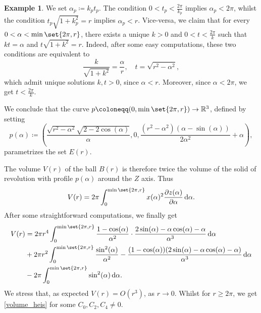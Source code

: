 \documentclass[a4paper,11pt,reqno]{amsart}
\theoremstyle{plain}
\theoremstyle{definition}
\newtheorem{example}[theorem]{Example}
\newcommand{\R}{\mathbb R}
\newcommand{\de}{\mathrm{d}}
\newcommand{\coloneq}{\coloneqq}
\begin{document}
\begin{example}
 We set $\alpha_p \coloneq k_p t_p$. The condition $0 < t_p < \frac{2\pi}{k_p}$ implies $\alpha_p < 2 \pi$, whilst the condition $t_p\sqrt{1+k_p^2}=r$ implies $\alpha_p < r$. Vice-versa, we claim that for every $0 < \alpha < \min\set{2 \pi, r}$, there exists a unique $k>0$ and $0 < t < \frac{2\pi}{k}$ such that $kt=\alpha$ and $t\sqrt{1+k^2}=r$. Indeed, after some easy computations, these two conditions are equivalent to
 \begin{equation*}
 \frac{k}{\sqrt{1+k^2}}=\frac{\alpha}{r}, \quad t=\sqrt{r^2-\alpha^2},
 \end{equation*}
 which admit unique solutions $k,t>0$, since $\alpha < r$. Moreover, since $\alpha < 2 \pi$, we get $t < \frac{2 \pi}{k}$.

 We conclude that the curve $p \coloneq (0,\min\set{2 \pi,r}) \to \R^3$, defined by setting
 \begin{equation*}
 p(\alpha) \coloneq \left(\frac{\sqrt{r^2-\alpha^2}\sqrt{2-2\cos(\alpha)}}{\alpha},0,\frac{(r^2-\alpha^2)(\alpha-\sin(\alpha))}{2\alpha^2}+\alpha \right),
 \end{equation*}
 parametrizes the set $E(r)$.

 The volume $V(r)$ of the ball $B(r)$ is therefore twice the volume of the solid of revolution with profile $p(\alpha)$ around the $Z$ axis. Thus
 \begin{equation*}
 V(r) = 2 \pi \int_0^{\min\set{2\pi,r}} x(\alpha)^2 \frac{\partial z(\alpha)}{\partial \alpha} \, \de \alpha .
 \end{equation*}
 After some straightforward computations, we finally get
 \begin{align*}
 V(r) &= 2 \pi r^4 \int_0^{\min\set{2\pi,r}} \frac{1-\cos(\alpha)}{\alpha^2}\cdot \frac{2\sin(\alpha)-\alpha\cos(\alpha)-\alpha}{\alpha^3} \, \de \alpha \\ 
 & + 2 \pi r^2 \int_0^{\min\set{2\pi,r}} \frac{\sin^2(\alpha)}{\alpha^2} - \frac{(1 - \cos(\alpha))(2\sin(\alpha)-\alpha\cos(\alpha)-\alpha)}{\alpha^3} \, \de \alpha \\
 & - 2 \pi \int_0^{\min\set{2\pi,r}} \sin^2(\alpha) \, \de \alpha .
 \end{align*}
 We stress that, as expected $V(r)=O(r^3)$, as $r \to 0$. Whilst for $r \ge 2 \pi$, we get \eqref{volume_heis}
 for some $C_0,C_2,C_4 \neq 0$.
 \end{example}
\end{document}
